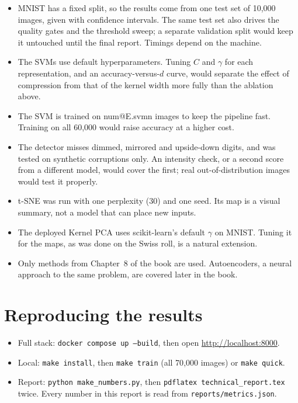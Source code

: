 \documentclass[11pt,a4paper]{article}
\makeatletter
\newcommand{\R}[1]{\csname num@#1\endcsname}
\makeatother
\begin{document}
\begin{itemize}
\item MNIST has a fixed split, so the results come from one test set of 10{,}000 images, given with confidence intervals. The same test set also drives the quality gates and the threshold sweep; a separate validation split would keep it untouched until the final report. Timings depend on the machine.
\item The SVMs use default hyperparameters. Tuning $C$ and $\gamma$ for each representation, and an accuracy-versus-$d$ curve, would separate the effect of compression from that of the kernel width more fully than the ablation above.
\item The SVM is trained on \R{E.svmn} images to keep the pipeline fast. Training on all 60{,}000 would raise accuracy at a higher cost.
\item The detector misses dimmed, mirrored and upside-down digits, and was tested on synthetic corruptions only. An intensity check, or a second score from a different model, would cover the first; real out-of-distribution images would test it properly.
\item t-SNE was run with one perplexity (30) and one seed. Its map is a visual summary, not a model that can place new inputs.
\item The deployed Kernel PCA uses scikit-learn's default $\gamma$ on MNIST. Tuning it for the maps, as was done on the Swiss roll, is a natural extension.
\item Only methods from Chapter~8 of the book are used. Autoencoders, a neural approach to the same problem, are covered later in the book.
\end{itemize}

\appendix
\section{Reproducing the results}

\begin{itemize}
\item Full stack: \texttt{docker compose up --build}, then open \url{http://localhost:8000}.
\item Local: \texttt{make install}, then \texttt{make train} (all 70{,}000 images) or \texttt{make quick}.
\item Report: \texttt{python make\_numbers.py}, then \texttt{pdflatex technical\_report.tex} twice. Every number in this report is read from \texttt{reports/metrics.json}.
\end{itemize}
\end{document}
